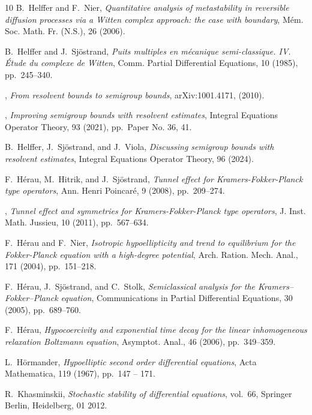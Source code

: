 \documentclass[12pt]{amsart}
\numberwithin{equation}{section}
\numberwithin{figure}{section}
\begin{document}
\begin{thebibliography}{10}
{\sc B.~Helffer and F.~Nier}, {\em Quantitative analysis of metastability in reversible diffusion processes via a {W}itten complex approach: the case with boundary}, M\'em. Soc. Math. Fr. (N.S.), 26 (2006).

{\sc B.~Helffer and J.~Sj\"ostrand}, {\em Puits multiples en m\'ecanique semi-classique. {IV}. \'{E}tude du complexe de {W}itten}, Comm. Partial Differential Equations, 10 (1985), pp.~245--340.

\bysame, {\em From resolvent bounds to semigroup bounds}, arXiv:1001.4171,  (2010).

\bysame, {\em Improving semigroup bounds with resolvent estimates}, Integral Equations Operator Theory, 93 (2021), pp.~Paper No. 36, 41.

{\sc B.~Helffer, J.~Sj\"ostrand, and J.~Viola}, {\em Discussing semigroup bounds with resolvent estimates}, Integral Equations Operator Theory, 96 (2024).

{\sc F.~H\'erau, M.~Hitrik, and J.~Sj\"ostrand}, {\em Tunnel effect for {K}ramers-{F}okker-{P}lanck type operators}, Ann. Henri Poincar\'e, 9 (2008), pp.~209--274.

\bysame, {\em Tunnel effect and symmetries for {K}ramers-{F}okker-{P}lanck type operators}, J. Inst. Math. Jussieu, 10 (2011), pp.~567--634.

{\sc F.~H\'erau and F.~Nier}, {\em Isotropic hypoellipticity and trend to equilibrium for the {F}okker-{P}lanck equation with a high-degree potential}, Arch. Ration. Mech. Anal., 171 (2004), pp.~151--218.

{\sc F.~H\'erau, J.~Sj\"ostrand, and C.~Stolk}, {\em Semiclassical analysis for the {K}ramers–{F}okker–{P}lanck equation}, Communications in Partial Differential Equations, 30 (2005), pp.~689--760.

{\sc F.~Hérau}, {\em Hypocoercivity and exponential time decay for the linear inhomogeneous relaxation {B}oltzmann equation}, Asymptot. Anal., 46 (2006), pp.~349--359.

{\sc L.~Hörmander}, {\em {Hypoelliptic second order differential equations}}, Acta Mathematica, 119 (1967), pp.~147 -- 171.

{\sc R.~Khasminskii}, {\em Stochastic stability of differential equations}, vol.~66, Springer Berlin, Heidelberg, 01 2012.


\end{thebibliography}
\end{document}
